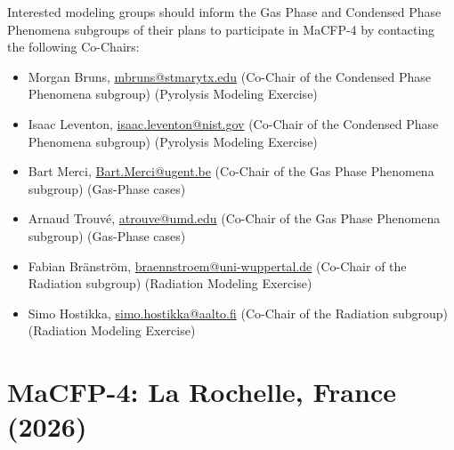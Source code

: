 \documentclass[12pt]{article}
\begin{document}
\newpage
Interested modeling groups should inform the Gas Phase and Condensed Phase Phenomena subgroups of their plans to participate in MaCFP-4 by contacting the following Co-Chairs:

\begin{itemize}[noitemsep]
\item Morgan Bruns, \href{mailto:mbruns@stmarytx.edu}{mbruns@stmarytx.edu} (Co-Chair of the Condensed Phase Phenomena subgroup) (Pyrolysis Modeling Exercise)
\item Isaac Leventon, \href{mailto:isaac.leventon@nist.gov}{isaac.leventon@nist.gov} (Co-Chair of the Condensed Phase Phenomena subgroup) (Pyrolysis Modeling Exercise)
\item Bart Merci, \href{mailto:Bart.Merci@ugent.be}{Bart.Merci@ugent.be} (Co-Chair of the Gas Phase Phenomena subgroup) (Gas-Phase cases)
\item Arnaud Trouv\'e, \href{mailto:atrouve@umd.edu}{atrouve@umd.edu} (Co-Chair of the Gas Phase Phenomena subgroup) (Gas-Phase cases)
\item Fabian Bränström, \href{mailto:braennstroem@uni-wuppertal.de}{braennstroem@uni-wuppertal.de} (Co-Chair of the Radiation subgroup) (Radiation Modeling Exercise)
 \item Simo Hostikka, \href{mailto:simo.hostikka@aalto.fi}{simo.hostikka@aalto.fi} (Co-Chair of the Radiation subgroup) (Radiation Modeling Exercise)
  \end{itemize}
 



\section{MaCFP-4: La Rochelle, France (2026)}
\label{sec:MaCFP-4}
\end{document}
